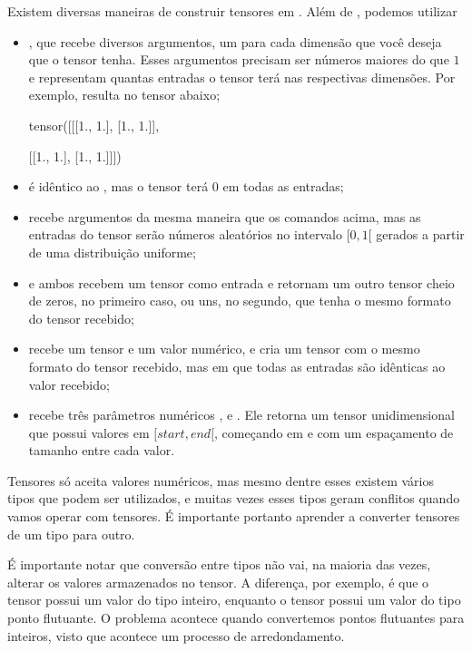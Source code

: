 \documentclass{article}
\begin{document}
Existem diversas maneiras de construir tensores em . Além de , podemos utilizar \begin{itemize}
    \item {}, que recebe diversos argumentos, um para cada dimensão que você deseja que o tensor tenha. Esses argumentos precisam ser números maiores do que $1$ e representam quantas entradas o tensor terá nas respectivas dimensões. Por exemplo,  resulta no tensor abaixo;
    \begin{python}
tensor([[[1., 1.],
         [1., 1.]],

        [[1., 1.],
         [1., 1.]]])
    \end{python}

    \item {} é idêntico ao , mas o tensor terá $0$ em todas as entradas;
    
    \item {} recebe argumentos da mesma maneira que os comandos acima, mas as entradas do tensor serão números aleatórios no intervalo $[0,1[$ gerados a partir de uma distribuição uniforme;
    
    \item {} e  ambos recebem um tensor como entrada e retornam um outro tensor cheio de zeros, no primeiro caso, ou uns, no segundo, que tenha o mesmo formato do tensor recebido;
    
    \item {} recebe um tensor e um valor numérico, e cria um tensor com o mesmo formato do tensor recebido, mas em que todas as entradas são idênticas ao valor recebido;

    \item {} recebe três parâmetros numéricos ,  e . Ele retorna um tensor unidimensional que possui valores em $[start, end[$, começando em  e com um espaçamento de tamanho  entre cada valor. 
\end{itemize}

Tensores só aceita valores numéricos, mas mesmo dentre esses existem vários tipos que podem ser utilizados, e muitas vezes esses tipos geram conflitos quando vamos operar com tensores. É importante portanto aprender a converter tensores de um tipo para outro.

É importante notar que conversão entre tipos não vai, na maioria das vezes, alterar os valores armazenados no tensor. A diferença, por exemplo, é que o tensor \pyth{[1]} possui um valor do tipo inteiro, enquanto o tensor \pyth{[1.]} possui um valor do tipo ponto flutuante. O problema acontece quando convertemos pontos flutuantes para inteiros, visto que acontece um processo de arredondamento.
\end{document}
